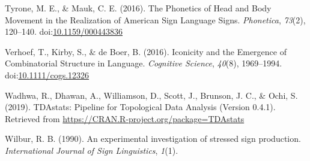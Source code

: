 \documentclass[
  man, noextraspace,floatsintext]{apa6}
\newlength{\cslhangindent}
\newenvironment{cslreferences}%
  {\setlength{\parindent}{0pt}%
  \everypar{\setlength{\hangindent}{\cslhangindent}}\ignorespaces}%
  {\par}
\begin{document}
\begin{cslreferences}
\leavevmode\hypertarget{ref-tyronePhoneticsHeadBody2016}{}%
Tyrone, M. E., \& Mauk, C. E. (2016). The Phonetics of Head and Body Movement in the Realization of American Sign Language Signs. \emph{Phonetica}, \emph{73}(2), 120--140. doi:\href{https://doi.org/10.1159/000443836}{10.1159/000443836}

\leavevmode\hypertarget{ref-verhoefIconicityEmergenceCombinatorial2016}{}%
Verhoef, T., Kirby, S., \& de Boer, B. (2016). Iconicity and the Emergence of Combinatorial Structure in Language. \emph{Cognitive Science}, \emph{40}(8), 1969--1994. doi:\href{https://doi.org/10.1111/cogs.12326}{10.1111/cogs.12326}

\leavevmode\hypertarget{ref-wadhwaTDAstatsPipelineTopological2019}{}%
Wadhwa, R., Dhawan, A., Williamson, D., Scott, J., Brunson, J. C., \& Ochi, S. (2019). TDAstats: Pipeline for Topological Data Analysis (Version 0.4.1). Retrieved from \url{https://CRAN.R-project.org/package=TDAstats}

\leavevmode\hypertarget{ref-wilburExperimentalInvestigationStressed1990}{}%
Wilbur, R. B. (1990). An experimental investigation of stressed sign production. \emph{International Journal of Sign Linguistics}, \emph{1}(1).
\end{cslreferences}

\endgroup
\end{document}
